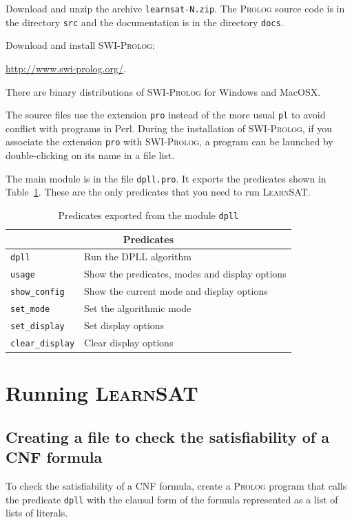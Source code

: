 \documentclass[11pt]{report}
\newcommand*{\p}[1]{\textup{\texttt{#1}}}
\newcommand*{\ls}{\textsc{LearnSAT}}
\newcommand*{\pl}{\textsc{Prolog}}
\newcommand*{\sw}{\textsc{SWI-Prolog}}
\begin{document}
Download and unzip the archive \p{learnsat-N.zip}. The \pl{} source code
is in the directory \p{src} and the documentation is in the directory
\p{docs}.

Download and install \sw{}:
\begin{center}
\url{http://www.swi-prolog.org/}.
\end{center}
There are binary distributions of \sw{} for Windows and MacOSX.

The source files use the extension \p{pro} instead of the more usual
\p{pl} to avoid conflict with programs in Perl. During the installation
of \sw{}, if you associate the extension \p{pro} with \sw{}, a
program can be launched by double-clicking on its name in a file list. 

The main module is in the file \p{dpll.pro}. It exports the predicates
shown in Table~\ref{tab.export}. These are the only predicates that you
need to run \ls{}.

\begin{table}
\begin{center}
\begin{tabular}{|l|l|}
\hline
\multicolumn{2}{|c|}{\textbf{\large Predicates}}\\
\hline
\p{dpll}&Run the DPLL algorithm\\
\p{usage}&Show the predicates, modes and display options \\
\p{show\_config}&Show the current mode and display options\\
\p{set\_mode}&Set the algorithmic mode\\
\p{set\_display}&Set display options\\
\p{clear\_display}&Clear display options\\
\hline
\end{tabular}
\end{center}
\caption{Predicates exported from the module \p{dpll}}\label{tab.export}
\end{table}


\section{Running \ls}

\subsection{Creating a file to check the satisfiability of a CNF formula}

To check the satisfiability of a CNF formula, create a \pl{} program
that calls the predicate \p{dpll} with the clausal form of the formula
represented as a list of lists of literals.
\end{document}
